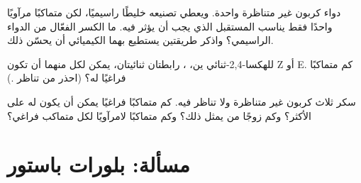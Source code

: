 \begin{exercise}[$\star\star\star$]\label{exo:g12:stereochemistry:13}
 دواء  كربون غير متناظرة واحدة. ويعطي تصنيعه خليطًا
راسيميًا، لكن متماكبًا مرآويًا واحدًا فقط يناسب المستقبل  الذي يجب
أن يؤثر فيه. ما الكسر الفعّال من الدواء الراسيمي؟ واذكر طريقتين
يستطيع بهما الكيميائي أن يحسّن ذلك.
\end{exercise}

\begin{exercise}[$\star\star\star$]\label{exo:g12:stereochemistry:14}
للهكسا-2,4-ثنائي ين، ، رابطتان ثنائيتان، يمكن لكل منهما
أن تكون Z أو E. كم متماكبًا فراغيًا له؟ (احذر من
تناظر .)
\end{exercise}

\begin{exercise}[$\star\star\star$]\label{exo:g12:stereochemistry:15}
 سكر ثلاث  كربون غير متناظرة ولا تناظر فيه. كم
متماكبًا فراغيًا يمكن أن يكون له على الأكثر؟ وكم زوجًا من 
يمثل ذلك؟ وكم متماكبًا لامرآويًا لكل متماكب فراغي؟
\end{exercise}

\section{مسألة: بلورات باستور}


